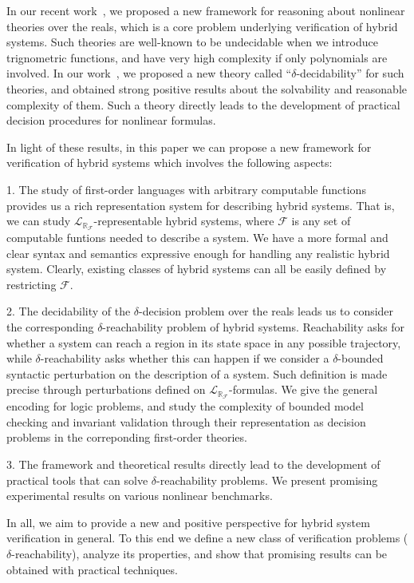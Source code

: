 \documentclass[envcountsect]{llncs}
\newcommand{\lrf}{\mathcal{L}_{\mathbb{R}_{\mathcal{F}}}}
\begin{document}
In our recent work~\cite{}, we proposed a new framework for reasoning about 
nonlinear theories over the reals, which is a core problem underlying
verification of hybrid systems. Such theories are well-known to be undecidable
when we introduce trignometric functions, and have very high complexity if only
polynomials are involved. In our work~\cite{}, we proposed a new theory called
``$\delta$-decidability'' for such theories, and obtained strong positive
results about the solvability and reasonable complexity of them. Such a theory
directly leads to the development of practical decision procedures for nonlinear
formulas. 

In light of these results, in this paper we can propose a new framework for 
verification of hybrid systems which involves the following aspects: 

1. The study of first-order languages with arbitrary computable functions 
provides us a rich representation system for describing hybrid systems. That is,
we can study $\lrf$-representable hybrid systems, where $\mathcal{F}$ is any set
of computable funtions needed to describe a system. We have a more formal and
clear syntax and semantics expressive enough for handling any realistic hybrid
system. Clearly, existing classes of hybrid systems can all be easily defined by
restricting $\mathcal{F}$. 

2. The decidability of the $\delta$-decision problem over the reals leads us to
consider the corresponding $\delta$-reachability problem of hybrid systems.
Reachability asks for whether a system can reach a region in its state space in
any possible trajectory, while $\delta$-reachability asks whether this can
happen if we consider a $\delta$-bounded syntactic perturbation on the
description of a system. Such definition is made precise through perturbations
defined on $\lrf$-formulas. We give the general encoding for logic problems, and
study the complexity of bounded model checking and invariant validation through
their representation as decision problems in the correponding first-order
theories. 

3. The framework and theoretical results directly lead to the development of 
practical tools that can solve $\delta$-reachability problems. We present
promising experimental results on various nonlinear benchmarks. 

In all, we aim to provide a new and positive perspective for hybrid system
verification in general. To this end we define a new class of verification
problems ($\delta$-reachability), analyze its properties, and show that
promising results can be obtained with practical techniques. 
\end{document}
